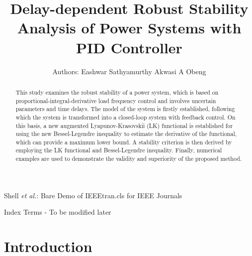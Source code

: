 \documentclass[journal]{IEEEtran}
\begin{document}
\title{Delay-dependent Robust Stability Analysis of Power Systems with PID Controller}

\author{ Authors: Eashwar Sathyamurthy  Akwasi A Obeng}
        
{Shell \MakeLowercase{\textit{et al.}}: Bare Demo of IEEEtran.cls for IEEE Journals}

\maketitle

\begin{abstract}
  This study examines the robust stability of a power system, which is based on proportional-integral-derivative load
frequency control and involves uncertain parameters and time delays. The model of the system is firstly established, following which
the system is transformed into a closed-loop system with feedback control. On this basis, a new augmented Lyapunov-Krasovskii (LK)
functional is established for using the new Bessel-Legendre inequality to estimate the derivative of the functional, which can provide
a maximum lower bound. A stability criterion is then derived by employing the LK functional and Bessel-Legendre inequality. Finally,
numerical examples are used to demonstrate the validity and superiority of the proposed method.
\end{abstract}

\begin{IEEEkeywords}
  Index Terms - To be modified later
\end{IEEEkeywords}

\section{Introduction}
\end{document}
